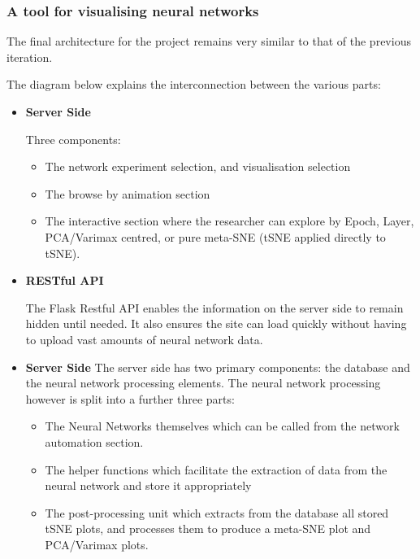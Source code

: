 \documentclass[a4paper,11pt,titlepage]{article}
\begin{document}
	\subsubsection{A tool for visualising neural networks}
	The final architecture for the project remains very similar to that of the previous iteration. 
	\par 
	The	diagram below explains the interconnection between the various parts:
	\begin{itemize}
		\item \textbf{Server Side}
			\par 
			Three components:
			\begin{itemize}
				\item The network experiment selection, and visualisation selection
				\item The browse by animation section
				\item The interactive section where the researcher can explore by Epoch, Layer, PCA/Varimax centred, or pure meta-SNE (tSNE applied directly to tSNE).
			\end{itemize}
		\item \textbf{RESTful API}	
			\par 
			The Flask Restful API enables the information on the server side to remain hidden until needed. It also ensures the site can load quickly without having to upload vast amounts of neural network data. 
		\item \textbf{Server Side}
			The server side has two primary components: the database and the neural network processing elements. The neural network processing however is split into a further three parts:
			\begin{itemize}
				\item The Neural Networks themselves which can be called from the network automation section.
				\item The helper functions which facilitate the extraction of data from the neural network and store it appropriately
				\item The post-processing unit which extracts from the database all stored tSNE plots, and processes them to produce a meta-SNE plot and PCA/Varimax plots.
			\end{itemize}
	\end{itemize}
	
\end{document}
